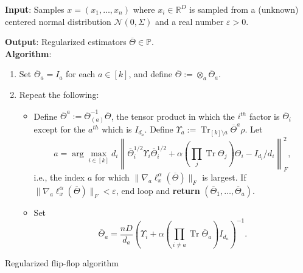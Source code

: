 \documentclass[aos]{imsart}
\theoremstyle{definition}
\numberwithin{equation}{section}
\DeclareMathOperator{\tr}{Tr}
\DeclarePairedDelimiter{\norm}{\lVert}{\rVert}
\newcommand{\R}{{\mathbb{R}}}
\newcommand{\otheta}{\overline{\Theta}}
\newcommand{\ot}{\otimes}
\newcommand{\eps}{\varepsilon}
\newcommand{\cN}{\mathcal{N}}
\newcommand{\SPD}{\mathbb{P}}
\newcommand{\samp}{x}
\begin{document}
\begin{Algorithm}
\textbf{Input}: Samples $\samp = (\samp_1, \ldots, \samp_n)$ where $\samp_i \in \R^D$ is sampled from a (unknown) centered normal distribution $\cN(0, \Sigma)$ and a real number $\eps > 0$.

\textbf{Output}: Regularized estimators $\otheta \in \SPD$.\\[.1ex]

\textbf{Algorithm}:
\begin{enumerate}
\item\label{it:flip-flop step 1 reg} Set $\otheta_a = I_a$ for each $a \in [k]$, and define $\otheta:= \otimes_a \otheta_a$.
\item\label{it:flip-flop step 2 reg} Repeat the following:
\begin{itemize}
\item Define $\otheta^a:= \otheta_{(a)}^{-1} \otheta$, the tensor product in which the $i^{th}$ factor is $\otheta_i$ except for the $a^{th}$ which is $I_{d_a}$. Define $\Upsilon_a :=\tr_{[k] \setminus a} \otheta^a \rho$. Let $$a = \arg\max_{i \in [k]} d_i   \left\| \otheta_i^{1/2} \Upsilon_i \otheta_i^{1/2}  + \alpha (\prod_j \tr \Theta_j) \Theta_i - I_{d_i}/d_i\right\|_F^2,$$
i.e., the index $a$ for which $\|\nabla_a \ell^\alpha_{\samp}(\otheta)\|_F$ is largest. If $\|\nabla_a \ell^\alpha_\samp(\otheta)\|_F < \eps$, end loop and \textbf{return} $(\otheta_1, \dots, \otheta_a)$.
\item Set
$$\otheta_a = \frac{n D}{d_a}\left(\Upsilon_i + \alpha \left(\prod_{i \neq a} \tr \otheta_a\right) I_{d_a} \right)^{-1}.$$
\end{itemize}
\end{enumerate}
\caption{Regularized flip-flop algorithm}\label{alg:reg-flip-flop}
\end{Algorithm}
\end{document}
